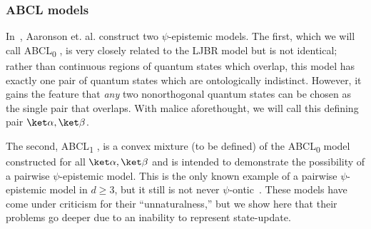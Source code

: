 \documentclass[%
 reprint,
superscriptaddress,
nofootinbib,
 amsmath,amssymb,
 prx, 
 accepted=2019-09-27,
]{quantumarticle}
\newcommand{\abclz}{{ABCL\textsubscript{0}} }
\newcommand{\abclo}{{ABCL\textsubscript{1}} }
\begin{document}
\subsubsection{ABCL models}
\label{sec:abcl-model}
In~\cite{Aaronsonpsepistemictheoriesrole2013}, Aaronson et. al. construct
two $\psi$-epistemic models. The first, which we will call \abclz, is
very closely related to the LJBR model but is not identical; rather
than continuous regions of quantum states which overlap, this model
has exactly one pair of quantum states which are ontologically
indistinct. However, it gains the feature that \emph{any} two
nonorthogonal quantum states can be chosen as the single pair that
overlaps. With malice aforethought, we will call this defining pair
$\ket\alpha,\ket\beta$.

The second, \abclo, is a convex mixture (to be defined) of the \abclz
model constructed for all $\ket\alpha,\ket\beta$ and is intended to
demonstrate the possibility of a pairwise $\psi$-epistemic model. This
is the only known example of a pairwise $\psi$-epistemic model in
$d\geq3$, but it still is not never
$\psi$-ontic~\cite{Leiferquantumstatereal2014,MontinaCommentmathoverflow2012}. These
models have come under criticism for their ``unnaturalness,'' but we
show here that their problems go deeper due to an inability to
represent state-update.
\end{document}
